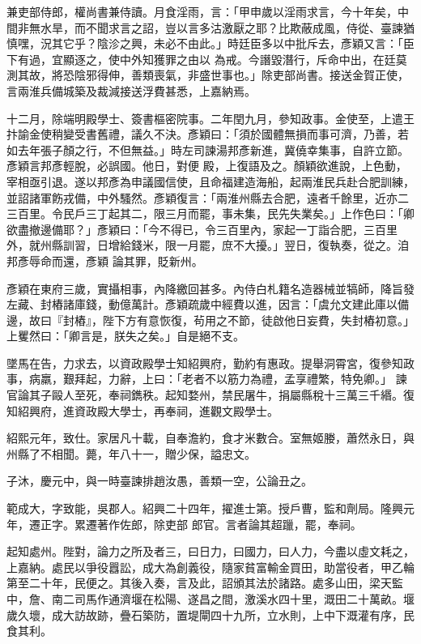 \begin{pinyinscope}
 兼吏部侍郎，權尚書兼侍讀。月食淫雨，言：「甲申歲以淫雨求言，今十年矣，中間非無水旱，而不聞求言之詔，豈以言多沽激厭之耶？比欺蔽成風，侍從、臺諫猶慎嘿，況其它乎？陰沴之興，未必不由此。」時廷臣多以中批斥去，彥穎又言：「臣下有過，宜顯逐之，使中外知獲罪之由以
 為戒。今譖毀潛行，斥命中出，在廷莫測其故，將恐陰邪得伸，善類喪氣，非盛世事也。」除吏部尚書。接送金賀正使，言兩淮兵備城築及裁減接送浮費甚悉，上嘉納焉。



 十二月，除端明殿學士、簽書樞密院事。二年閏九月，參知政事。金使至，上遣王抃諭金使稍變受書舊禮，議久不決。彥穎曰：「須於國體無損而事可濟，乃善，若如去年張子顏之行，不但無益。」時左司諫湯邦彥新進，冀僥幸集事，自許立節。彥穎言邦彥輕脫，必誤國。他日，對便
 殿，上復語及之。顏穎欲進說，上色動，宰相亟引退。遂以邦彥為申議國信使，且命福建造海船，起兩淮民兵赴合肥訓練，並詔諸軍飭戎備，中外騷然。彥穎復言：「兩淮州縣去合肥，遠者千餘里，近亦二三百里。令民戶三丁起其二，限三月而罷，事未集，民先失業矣。」上作色曰：「卿欲盡撤邊備耶？」彥穎曰：「今不得已，令三百里內，家起一丁詣合肥，三百里外，就州縣訓習，日增給錢米，限一月罷，庶不大擾。」翌日，復執奏，從之。洎邦彥辱命而還，彥穎
 論其罪，貶新州。



 彥穎在東府三歲，實攝相事，內降繳回甚多。內侍白札籍名造器械並犒師，降旨發左藏、封樁諸庫錢，動億萬計。彥穎疏歲中經費以進，因言：「虞允文建此庫以備邊，故曰『封樁』，陛下方有意恢復，茍用之不節，徒啟他日妄費，失封樁初意。」上矍然曰：「卿言是，朕失之矣。」自是絕不支。



 墜馬在告，力求去，以資政殿學士知紹興府，勤約有惠政。提舉洞霄宮，復參知政事，病羸，艱拜起，力辭，上曰：「老者不以筋力為禮，孟享禮繁，特免卿。」
 諫官論其子毆人至死，奉祠鐫秩。起知婺州，禁民屠牛，捐屬縣稅十三萬三千緡。復知紹興府，進資政殿大學士，再奉祠，進觀文殿學士。



 紹熙元年，致仕。家居凡十載，自奉澹約，食才米數合。室無姬媵，蕭然永日，與州縣了不相聞。薨，年八十一，贈少保，謚忠文。



 子沐，慶元中，與一時臺諫排趙汝愚，善類一空，公論丑之。



 範成大，字致能，吳郡人。紹興二十四年，擢進士第。授戶曹，監和劑局。隆興元年，遷正字。累遷著作佐郎，除吏部
 郎官。言者論其超躐，罷，奉祠。



 起知處州。陛對，論力之所及者三，曰日力，曰國力，曰人力，今盡以虛文耗之，上嘉納。處民以爭役囂訟，成大為創義役，隨家貧富輸金買田，助當役者，甲乙輪第至二十年，民便之。其後入奏，言及此，詔頒其法於諸路。處多山田，梁天監中，詹、南二司馬作通濟堰在松陽、遂昌之間，激溪水四十里，溉田二十萬畝。堰歲久壞，成大訪故跡，疊石築防，置堤閘四十九所，立水則，上中下溉灌有序，民食其利。




\end{pinyinscope}
